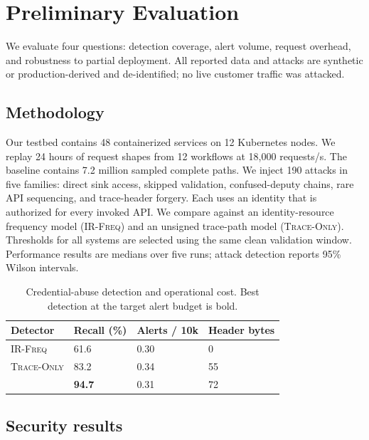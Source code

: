 \section{Preliminary Evaluation}
\label{sec:evaluation}

We evaluate four questions: detection coverage, alert volume, request overhead,
and robustness to partial deployment. All reported data and attacks are
synthetic or production-derived and de-identified; no live customer traffic was
attacked.

\subsection{Methodology}

Our testbed contains 48 containerized services on 12 Kubernetes nodes. We
replay 24 hours of request shapes from 12 workflows at 18,000 requests/s. The
baseline contains 7.2 million sampled complete paths. We inject 190 attacks in
five families: direct sink access, skipped validation, confused-deputy chains,
rare API sequencing, and trace-header forgery. Each uses an identity that is
authorized for every invoked API. We compare against an identity-resource
frequency model (\textsc{IR-Freq}) and an unsigned trace-path model
(\textsc{Trace-Only}). Thresholds for all systems are selected using the same
clean validation window. Performance results are medians over five runs; attack
detection reports 95\% Wilson intervals.

\begin{table}[t]
  \centering
  \caption{Credential-abuse detection and operational cost. Best detection at
  the target alert budget is bold.}
  \label{tab:main}
  \small
  \setlength{\tabcolsep}{3.5pt}
  \begin{tabularx}{\columnwidth}{@{}lYYY@{}}
    \toprule
    Detector & Recall (\%) & Alerts / 10k & Header bytes \\
    \midrule
    \textsc{IR-Freq}    & 61.6 & 0.30 & 0 \\
    \textsc{Trace-Only} & 83.2 & 0.34 & 55 \\
    \system{}           & \textbf{94.7} & 0.31 & 72 \\
    \bottomrule
  \end{tabularx}
\end{table}

\subsection{Security results}

